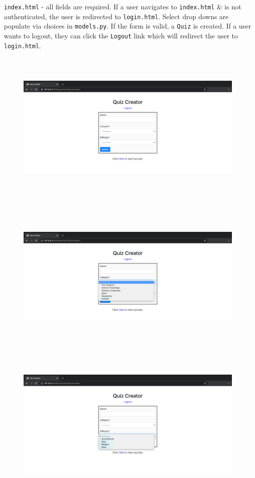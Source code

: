 \documentclass{article}
\begin{document}
\newpage

\texttt{index.html} - all fields are required. If a user navigates to \texttt{index.html} \& is not authenticated, the user is redirected to \texttt{login.html}. Select drop downs are populate via choices in \texttt{models.py}. If the form is valid, a \texttt{Quiz} is created. If a user wants to logout, they can click the \texttt{Logout} link which will redirect the user to \texttt{login.html}.

\begin{figure}[H]
  \includegraphics[width=175mm, height=75mm]{./img/12-expected-quiz-3.png}
\end{figure}

\begin{figure}[H]
  \includegraphics[width=175mm, height=75mm]{./img/12-expected-quiz-4.png}
\end{figure}

\begin{figure}[H]
  \includegraphics[width=175mm, height=75mm]{./img/12-expected-quiz-5.png}
\end{figure}
\end{document}
